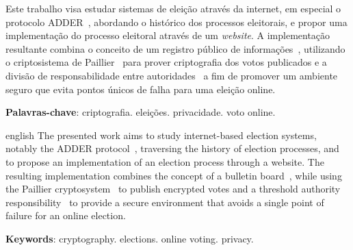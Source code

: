 \begin{resumo}
    Este trabalho visa estudar sistemas de eleição através da internet, em
    especial o protocolo ADDER~\cite{kiayias2006internet}, abordando o
    histórico dos processos eleitorais, e propor uma implementação do processo
    eleitoral através de um \textit{website}. A implementação resultante
    combina o conceito de um registro público de
    informações~\cite{benaloh1987verifiable}, utilizando o criptosistema de
    Paillier~\cite{paillier1999public} para prover criptografia dos votos
    publicados e a divisão de responsabilidade entre
    autoridades~\cite{fouque2000sharing} a fim de promover um ambiente seguro
    que evita pontos únicos de falha para uma eleição online.

    \textbf{Palavras-chave}: criptografia. eleições. privacidade. voto online.
\end{resumo}

\begin{resumo}[Abstract]
    \begin{otherlanguage*}{english}
        The presented work aims to study internet-based election systems,
        notably the ADDER protocol~\cite{kiayias2006internet}, traversing the
        history of election processes, and to propose an implementation of an
        election process through a website. The resulting implementation
        combines the concept of a bulletin board~\cite{benaloh1987verifiable},
        while using the Paillier cryptosystem~\cite{paillier1999public} to
        publish encrypted votes and a threshold authority
        responsibility~\cite{fouque2000sharing} to provide a secure environment
        that avoids a single point of failure for an online election.

        \textbf{Keywords}: cryptography. elections. online voting. privacy.
    \end{otherlanguage*}
\end{resumo}
